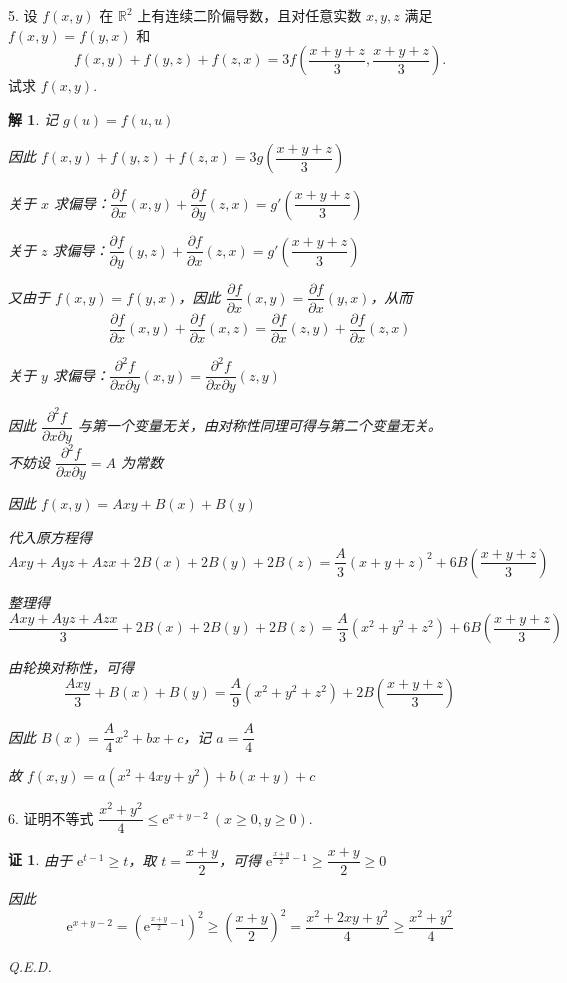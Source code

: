 \documentclass[a4paper,12pt]{article}
\newtheorem*{pf}{证}
\newtheorem*{sol}{解}
\begin{document}
5. 设 $f(x,y)$ 在 $\mathbb{R}^2$ 上有连续二阶偏导数，且对任意实数 $x,y,z$ 满足 $f(x,y)=f(y,x)$ 和
$$
    f(x,y)+f(y,z)+f(z,x)=3f\left(\frac{x+y+z}{3},\frac{x+y+z}{3}\right).
$$
试求 $f(x,y)$.
\begin{sol}
    记 $g(u)=f(u,u)$

    因此 $f(x,y)+f(y,z)+f(z,x)=3g\left(\dfrac{x+y+z}{3}\right)$

    关于 $x$ 求偏导：$\dfrac{\partial f}{\partial x}(x,y)+\dfrac{\partial f}{\partial y}(z,x)=g'\left(\dfrac{x+y+z}{3}\right)$

    关于 $z$ 求偏导：$\dfrac{\partial f}{\partial y}(y,z)+\dfrac{\partial f}{\partial x}(z,x)=g'\left(\dfrac{x+y+z}{3}\right)$

    又由于 $f(x,y)=f(y,x)$，因此 $\dfrac{\partial f}{\partial x}(x,y)=\dfrac{\partial f}{\partial x}(y,x)$，从而
    $$
        \dfrac{\partial f}{\partial x}(x,y)+\dfrac{\partial f}{\partial x}(x,z)=\dfrac{\partial f}{\partial x}(z,y)+\dfrac{\partial f}{\partial x}(z,x)
    $$

    关于 $y$ 求偏导：$\dfrac{\partial^2 f}{\partial x \partial y}(x,y)=\dfrac{\partial^2 f}{\partial x \partial y}(z,y)$

    因此 $\dfrac{\partial^2 f}{\partial x \partial y}$ 与第一个变量无关，由对称性同理可得与第二个变量无关。\\
    不妨设 $\dfrac{\partial^2 f}{\partial x \partial y}=A$ 为常数

    因此 $f(x,y)=Axy+B(x)+B(y)$

    代入原方程得
    $$
        Axy+Ayz+Azx+2B(x)+2B(y)+2B(z)=\dfrac{A}{3}(x+y+z)^2+6B\left(\dfrac{x+y+z}{3}\right)
    $$

    整理得
    $$
        \dfrac{Axy+Ayz+Azx}{3}+2B(x)+2B(y)+2B(z)=\dfrac{A}{3}(x^2+y^2+z^2)+6B\left(\dfrac{x+y+z}{3}\right)
    $$

    由轮换对称性，可得
    $$
        \dfrac{Axy}{3}+B(x)+B(y)=\dfrac{A}{9}(x^2+y^2+z^2)+2B\left(\dfrac{x+y+z}{3}\right)
    $$

    因此 $B(x)=\dfrac{A}{4}x^2+bx+c$，记 $a=\dfrac{A}{4}$

    故 $f(x,y)=a(x^2+4xy+y^2)+b(x+y)+c$
\end{sol}

6. 证明不等式 $\dfrac{x^2+y^2}{4} \le \mathrm{e}^{x+y-2}\ (x \ge 0,y \ge 0)$.
\begin{pf}
    由于 $\mathrm{e}^{t-1}\geq t$，取 $t=\dfrac{x+y}{2}$，可得 $\mathrm{e}^{\frac{x+y}{2}-1}\geq \dfrac{x+y}{2}\geq 0$

    因此
    $$
        \mathrm{e}^{x+y-2}=\left(\mathrm{e}^{\frac{x+y}{2}-1}\right)^2\geq\left(\dfrac{x+y}{2}\right)^2=\dfrac{x^2+2xy+y^2}{4}\geq\dfrac{x^2+y^2}{4}
    $$

    Q.E.D.
\end{pf}
\end{document}
